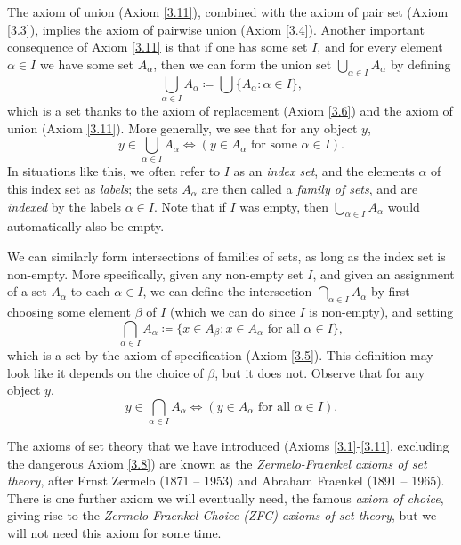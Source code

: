 \begin{note}
The axiom of union (Axiom \ref{3.11}), combined with the axiom of pair set (Axiom \ref{3.3}), implies the axiom of pairwise union (Axiom \ref{3.4}).
Another important consequence of Axiom \ref{3.11} is that if one has some set \(I\), and for every element \(\alpha \in I\) we have some set \(A_{\alpha}\), then we can form the union set \(\bigcup_{\alpha \in I} A_{\alpha}\) by defining
\[
    \bigcup_{\alpha \in I} A_{\alpha} \coloneqq \bigcup \{A_{\alpha} : \alpha \in I\},
\]
which is a set thanks to the axiom of replacement (Axiom \ref{3.6}) and the axiom of union (Axiom \ref{3.11}).
More generally, we see that for any object \(y\),
\[
    y \in \bigcup_{\alpha \in I} A_{\alpha} \iff (y \in A_{\alpha} \text{ for some } \alpha \in I).
\]
In situations like this, we often refer to \(I\) as an \emph{index set}, and the elements \(\alpha\) of this index set as \emph{labels};
the sets \(A_{\alpha}\) are then called a \emph{family of sets}, and are \emph{indexed} by the labels \(\alpha \in I\).
Note that if \(I\) was empty, then \(\bigcup_{\alpha \in I} A_{\alpha}\) would automatically also be empty.
\end{note}

\begin{note}
We can similarly form intersections of families of sets, as long as the index set is non-empty.
More specifically, given any non-empty set \(I\), and given an assignment of a set \(A_{\alpha}\) to each \(\alpha \in I\), we can define the intersection \(\bigcap_{\alpha \in I} A_{\alpha}\) by first choosing some element \(\beta\) of \(I\) (which we can do since \(I\) is non-empty), and setting
\[
    \bigcap_{\alpha \in I} A_{\alpha} \coloneqq \{x \in A_{\beta} : x \in A_{\alpha} \text{ for all } \alpha \in I\},
\]
which is a set by the axiom of specification (Axiom \ref{3.5}).
This definition may look like it depends on the choice of \(\beta\), but it does not.
Observe that for any object \(y\),
\[
    y \in \bigcap_{\alpha \in I} A_{\alpha} \iff (y \in A_{\alpha} \text{ for all } \alpha \in I).
\]
\end{note}

\setcounter{theorem}{11}
\begin{remark}\label{3.4.12}
The axioms of set theory that we have introduced (Axioms \ref{3.1}-\ref{3.11}, excluding the dangerous Axiom \ref{3.8}) are known as the \emph{Zermelo-Fraenkel axioms of set theory}, after Ernst Zermelo (1871 -- 1953) and Abraham Fraenkel (1891 -- 1965).
There is one further axiom we will eventually need, the famous \emph{axiom of choice}, giving rise to the \emph{Zermelo-Fraenkel-Choice (ZFC) axioms of set theory}, but we will not need this axiom for some time.
\end{remark}

